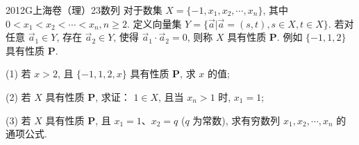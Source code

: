 
\begin{problem}{2012}{G}{上海卷（理）}{23}{数列}
对于数集 $X=\{-1, x_1, x_2, \cdots, x_n\}$, 其中 $0 < x_1 < x_2 < \cdots < x_n, n \ge 2$. 定义向量集 $Y = \{ \vec{a} | \vec{a}=(s, t), s \in X, t \in X \}$. 若对任意 $\vec{a}_1 \in Y$, 存在 $\vec{a}_2 \in Y$, 使得 $\vec{a}_1 \cdot \vec{a}_2 = 0$, 则称 $X$ 具有性质 \textbf{P}. 例如 $\{-1, 1, 2\}$ 具有性质 \textbf{P}.

(1) 若 $x > 2$, 且 $\{-1, 1, 2, x\}$ 具有性质 \textbf{P}, 求 $x$ 的值;

(2) 若 $X$ 具有性质 \textbf{P}, 求证： $1 \in X$, 且当 $x_n > 1$ 时, $x_1 = 1$;

(3) 若 $X$ 具有性质 \textbf{P}, 且 $x_1 = 1$、$x_2 = q$ ($q$ 为常数), 求有穷数列 $x_1, x_2, \cdots, x_n$ 的通项公式.
\end{problem}


